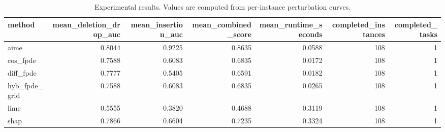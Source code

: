 \begin{table}[t]
\caption{Experimental results. Values are computed from per-instance perturbation curves.}
\label{tab:main_results_computed}
\centering
\begin{tabular}{lrrrrrr}
\toprule
method & mean\_deletion\_drop\_auc & mean\_insertion\_auc & mean\_combined\_score & mean\_runtime\_seconds & completed\_instances & completed\_tasks \\
\midrule
aime & 0.8044 & 0.9225 & 0.8635 & 0.0588 & 108 & 1 \\
cos\_fpde & 0.7588 & 0.6083 & 0.6835 & 0.0172 & 108 & 1 \\
diff\_fpde & 0.7777 & 0.5405 & 0.6591 & 0.0182 & 108 & 1 \\
hyb\_fpde\_grid & 0.7588 & 0.6083 & 0.6835 & 0.0265 & 108 & 1 \\
lime & 0.5555 & 0.3820 & 0.4688 & 0.3119 & 108 & 1 \\
shap & 0.7866 & 0.6604 & 0.7235 & 0.3324 & 108 & 1 \\
\bottomrule
\end{tabular}

\end{table}
